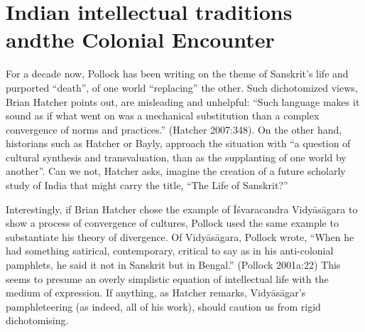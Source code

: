 \section{Indian intellectual traditions and\hfill\break the Colonial Encounter}%

For a decade now, Pollock has been writing on the theme of Sanskrit’s life and purported “death”, of one world “replacing” the other. Such dichotomized views, Brian Hatcher points out, are misleading and unhelpful: “Such language makes it sound as if what went on was a mechanical substitution than a complex convergence of norms and practices.” (Hatcher 2007:348). On the other hand, historians such as Hatcher or Bayly, approach the situation with “a question of cultural synthesis and transvaluation, than as the supplanting of one world by another”. Can we not, Hatcher asks, imagine the creation of a future scholarly study of India that might carry the title, “The Life of Sanskrit?”  

Interestingly, if  Brian Hatcher chose the example of Īśvaracandra Vidyāsāgara to show a process of convergence of cultures, Pollock used the same example to substantiate his theory of divergence. Of Vidyāsāgara, Pollock wrote, “When he had something satirical, contemporary, critical to say as in his anti-colonial pamphlets, he said it not in Sanskrit but in Bengal.” (Pollock 2001a:22) This seems to presume an overly simplistic equation of intellectual life with the medium of expression. If anything, as Hatcher remarks, Vidyāsāgar’s pamphleteering (as indeed, all of his work), should caution us from rigid dichotomising.

